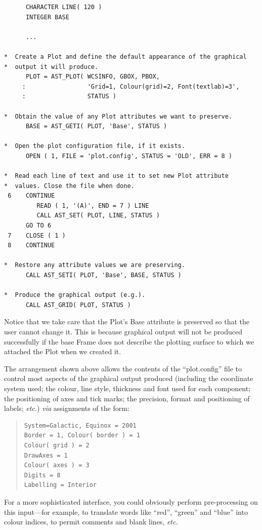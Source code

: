 \documentclass[twoside,11pt]{article}
\newcommand{\htmlref}[2]{#1}
\begin{document}
\small
\begin{verbatim}
      CHARACTER LINE( 120 )
      INTEGER BASE

      ...

*  Create a Plot and define the default appearance of the graphical
*  output it will produce.
      PLOT = AST_PLOT( WCSINFO, GBOX, PBOX,
     :                 'Grid=1, Colour(grid)=2, Font(textlab)=3',
     :                 STATUS )

*  Obtain the value of any Plot attributes we want to preserve.
      BASE = AST_GETI( PLOT, 'Base', STATUS )

*  Open the plot configuration file, if it exists.
      OPEN ( 1, FILE = 'plot.config', STATUS = 'OLD', ERR = 8 )

*  Read each line of text and use it to set new Plot attribute
*  values. Close the file when done.
 6    CONTINUE
         READ ( 1, '(A)', END = 7 ) LINE
         CALL AST_SET( PLOT, LINE, STATUS )
      GO TO 6
 7    CLOSE ( 1 )
 8    CONTINUE

*  Restore any attribute values we are preserving.
      CALL AST_SETI( PLOT, 'Base', BASE, STATUS )

*  Produce the graphical output (e.g.).
      CALL AST_GRID( PLOT, STATUS )
\end{verbatim}
\normalsize

Notice that we take care that the Plot's \htmlref{Base}{Base} attribute is preserved
so that the user cannot change it. This is because graphical output
will not be produced successfully if the base \htmlref{Frame}{Frame} does not describe
the plotting surface to which we attached the Plot when we created it.

The arrangement shown above allows the contents of the ``plot.config''
file to control most aspects of the graphical output produced
(including the coordinate system used; the colour, line style,
thickness and font used for each component; the positioning of axes
and tick marks; the precision, format and positioning of labels;
{\em{etc.}}) {\em{via}} assignments of the form:

\begin{quote}
\small
\begin{verbatim}
System=Galactic, Equinox = 2001
Border = 1, Colour( border ) = 1
Colour( grid ) = 2
DrawAxes = 1
Colour( axes ) = 3
Digits = 8
Labelling = Interior
\end{verbatim}
\normalsize
\end{quote}

For a more sophisticated interface, you could obviously perform
pre-processing on this input---for example, to translate words like
``red'', ``green'' and ``blue'' into colour indices, to permit
comments and blank lines, {\em{etc.}}
\end{document}

